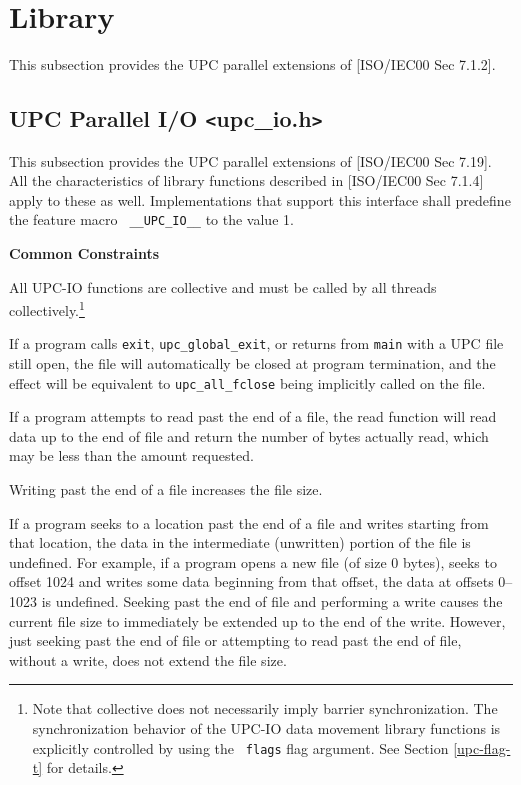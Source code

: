 \pagebreak
\section{Library}

\npf This subsection provides the UPC parallel extensions of
    [ISO/IEC00 Sec 7.1.2].

\subsection{UPC Parallel I/O \texttt{<}upc\_io.h\texttt{>}}

\npf This subsection provides the UPC parallel extensions of [ISO/IEC00 
    Sec 7.19].  All the characteristics of library functions described
    in [ISO/IEC00 Sec 7.1.4] apply to these as well.  Implementations
    that support this interface shall predefine the feature macro {\tt
    \_\_UPC\_IO\_\_} to the value 1.

{\bf Common Constraints}

\np All UPC-IO functions are collective and must be called by all threads collectively.\footnote{Note that 
collective does not necessarily imply barrier synchronization.  The synchronization behavior of the 
UPC-IO data movement library functions is explicitly controlled by using the {\tt
flags} flag argument. See Section \ref{upc-flag-t} for details.}

\np If a program calls {\tt exit}, {\tt upc\_global\_exit}, or returns from {\tt main} with a
UPC file still open, the file will automatically be closed at program
termination, and the effect will be equivalent to {\tt upc\_all\_fclose} being
implicitly called on the file.

\np If a program attempts to read past the end of a file, the read function
will read data up to the end of file and return the number of bytes actually
read, which may be less than the amount requested.

\np Writing past the end of a file increases the file size.

\np If a program seeks to a location past the end of a file and writes
starting from that location, the data in the intermediate (unwritten)
portion of the file is undefined. For example, if a program opens a new file
(of size 0 bytes), seeks to offset 1024 and writes some data beginning from
that offset, the data at offsets 0--1023 is undefined. Seeking past the end
of file and performing a write causes the current file size to immediately
be extended up to the end of the write. However, just seeking past the end
of file or attempting to read past the end of file, without a write, does
not extend the file size.

